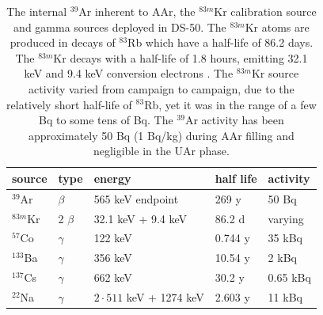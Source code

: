 \begin{table}[htbp]
\centering
\caption{The internal $^{39}$Ar inherent to AAr, the $^{83m}$Kr calibration source and gamma sources deployed in DS-50. The $^{83m}$Kr atoms are produced in decays of $^{83}$Rb which have a half-life of 86.2 days. The $^{83m}$Kr decays with a half-life of 1.8 hours, emitting 32.1 keV and 9.4 keV conversion electrons \cite{Lippincott:2010jb}. The $^{83m}$Kr source activity varied from campaign to campaign, due to the relatively short half-life of $^{83}$Rb, yet it was in the range of a few Bq to some tens of Bq. The $^{39}$Ar activity has been approximately 50 Bq (1 Bq/kg) during AAr filling and negligible in the UAr phase.}
\centering
\begin{tabular}{|l|l|l|l|l|}
\hline
\textbf{source} & \textbf{type} & \textbf{energy} & \textbf{half life} & \textbf{activity} \\ \hline
$^{39}$Ar & $\beta$ &  565 keV endpoint& 269 y  & 50 Bq\\ \hline
$^{83m}$Kr & 2 $\beta$ &  32.1 keV + 9.4 keV & 86.2 d & varying\\ \hline\hline
$^{57}$Co & $\gamma$ & 122 keV & 0.744 y  & 35 kBq \\ \hline
$^{133}$Ba & $\gamma$ & 356 keV & 10.54 y & 2 kBq \\ \hline
$^{137}$Cs & $\gamma$ & 662 keV & 30.2 y & 0.65 kBq \\ \hline
$^{22}$Na & $\gamma$ & $2\cdot 511$ keV + 1274 keV & 2.603 y & 11 kBq \\ \hline
\end{tabular}
\label{tbl:GammaSources}
\end{table}


